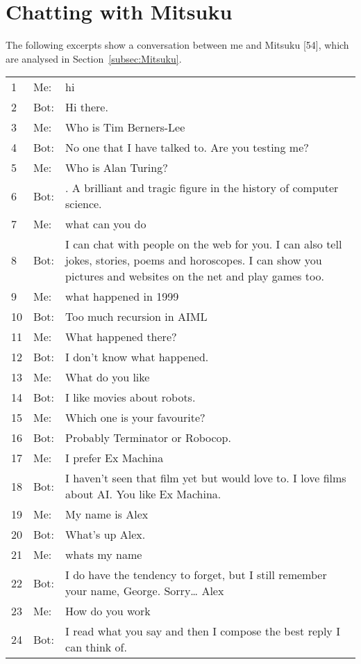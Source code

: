 \chapter{Chatting with Mitsuku}
The following excerpts show a conversation between me and Mitsuku [54], which are analysed in Section~\ref{subsec:Mitsuku}.
\renewcommand*{\arraystretch}{1.1}
\begin{longtable}{@{}p{} p{}  p{}@{}}
	\toprule
	1 & Me: & hi \\ 
	2 & Bot: & Hi there. \\ 
	3 & Me: & Who is Tim Berners-Lee \\ 
	4 & Bot: & No one that I have talked to. Are you testing me? \\ 
	5 & Me: & Who is Alan Turing? \\ 
	6 & Bot: & . A brilliant and tragic figure in the history of computer science. \\ 
	7 & Me: & what can you do \\ 
	8 & Bot: & I can chat with people on the web for you. I can also tell jokes, stories, poems and horoscopes. I can show you pictures and websites on the net and play games too. \\ 
	9 & Me: & what happened in 1999 \\ 
	10 & Bot: & Too much recursion in AIML \\ 
	11 & Me: & What happened there? \\ 
	12 & Bot: & I don't know what happened. \\ 
	13 & Me: & What do you like \\ 
	14 & Bot: & I like movies about robots. \\ 
	15 & Me: & Which one is your favourite? \\ 
	16 & Bot: & Probably Terminator or Robocop. \\ 
	17 & Me: & I prefer Ex Machina \\ 
	18 & Bot: & I haven't seen that film yet but would love to. I love films about AI. You like Ex Machina. \\ 
	19 & Me: & My name is Alex \\ 
	20 & Bot: & What's up Alex. \\ 
	21 & Me: & whats my name \\ 
	22 & Bot: & I do have the tendency to forget, but I still remember your name, George. Sorry… Alex \\ 
	23 & Me: & How do you work \\ 
	24 & Bot: & I read what you say and then I compose the best reply I can think of. \\ 

\end{longtable}
